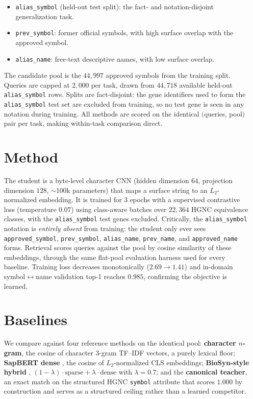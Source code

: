\documentclass[11pt]{article}
\begin{document}
\begin{itemize}
\itemsep0.2em
\item \texttt{alias\_symbol} (held-out test split): the fact- and notation-disjoint
generalization task.
\item \texttt{prev\_symbol}: former official symbols, with high surface overlap with
the approved symbol.
\item \texttt{alias\_name}: free-text descriptive names, with low surface overlap.
\end{itemize}

The candidate pool is the $44{,}997$ approved symbols from the training split.
Queries are capped at $2{,}000$ per task, drawn from $44{,}718$ available held-out
\texttt{alias\_symbol} rows. Splits are fact-disjoint: the gene identifiers used to
form the \texttt{alias\_symbol} test set are excluded from training, so no test
gene is seen in any notation during training. All methods are scored on the
identical $($queries, pool$)$ pair per task, making within-task comparison direct.

\section{Method}
\label{sec:method}
The student is a byte-level character CNN (hidden dimension $64$, projection
dimension $128$, $\sim$100k parameters) that maps a surface string to an
$L_2$-normalized embedding. It is trained for $3$ epochs with a supervised
contrastive loss \citep{supcon} (temperature $0.07$) using class-aware batches over
$22{,}364$ HGNC equivalence classes, with the \texttt{alias\_symbol} test genes
excluded. Critically, the \texttt{alias\_symbol} notation is \emph{entirely absent}
from training: the student only ever sees \texttt{approved\_symbol},
\texttt{prev\_symbol}, \texttt{alias\_name}, \texttt{prev\_name}, and
\texttt{approved\_name} forms. Retrieval scores queries against the pool by cosine
similarity of these embeddings, through the same flat-pool evaluation harness used
for every baseline. Training loss decreases monotonically ($2.69 \rightarrow 1.41$)
and in-domain symbol$\leftrightarrow$name validation top-1 reaches $0.985$,
confirming the objective is learned.

\section{Baselines}
\label{sec:baselines}
We compare against four reference methods on the identical pool:
\textbf{character $n$-gram}, the cosine of character $3$-gram TF--IDF vectors, a
purely lexical floor; \textbf{SapBERT dense} \citep{sapbert}, the cosine of
$L_2$-normalized CLS embeddings; \textbf{BioSyn-style hybrid} \citep{biosyn},
$(1-\lambda)\cdot\text{sparse} + \lambda\cdot\text{dense}$ with $\lambda=0.7$; and
the \textbf{canonical teacher}, an exact match on the structured HGNC
\texttt{symbol} attribute that scores $1.000$ by construction and serves as a
structured ceiling rather than a learned competitor.
\end{document}
